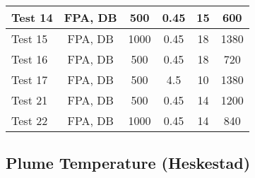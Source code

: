 \begin{table}[!h]
\begin{center}
\begin{tabular}{|l|c|c|c|c|c|}
Test 14    &  FPA, DB           &  500            &  0.45           &  15                &  600             \\ \hline
Test 15    &  FPA, DB           &  1000           &  0.45           &  18                &  1380            \\ \hline
Test 16    &  FPA, DB           &  500            &  0.45           &  18                &  720             \\ \hline
Test 17    &  FPA, DB           &  500            &  4.5            &  10                &  1380            \\ \hline
Test 21    &  FPA, DB           &  500            &  0.45           &  14                &  1200            \\ \hline
Test 22    &  FPA, DB           &  1000           &  0.45           &  14                &  840             \\ \hline
\end{tabular}
\end{center}
\end{table}


\clearpage


\subsection*{Plume Temperature (Heskestad)}

